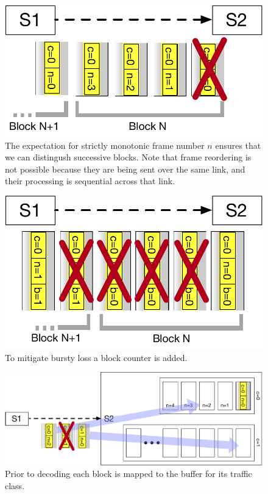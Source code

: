 \documentclass[sigconf]{acmart}
\begin{document}
\begin{figure}
  \centering
  \includegraphics[width=0.4\paperwidth]{loss_example.pdf}
  \caption{\label{fig:example-loss}The expectation for strictly monotonic frame
  number $n$ ensures that we can distingush successive blocks. Note that frame
  reordering is not possible because they are being sent over the same link,
  and their processing is sequential across that link.}
\end{figure}

\begin{figure}
  \centering
  \includegraphics[width=0.4\paperwidth]{loss_example2.pdf}
  \caption{\label{fig:example-loss2}To mitigate bursty loss a block counter is added.}
\end{figure}

\begin{figure}
  \centering
  \includegraphics[width=0.4\paperwidth]{decode_example.pdf}
  \caption{\label{fig:example-decode}Prior to decoding each block is mapped to the buffer for its traffic class.}
\end{figure}
\end{document}
